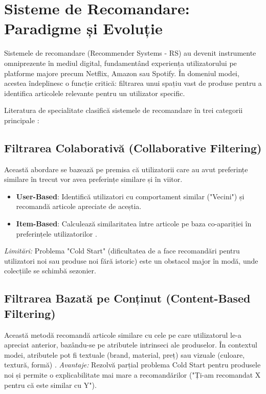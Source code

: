 \section{Sisteme de Recomandare: Paradigme și Evoluție}
\label{sec:recsys_paradigms}

Sistemele de recomandare (Recommender Systems - RS) au devenit instrumente omniprezente în mediul digital, fundamentând experiența utilizatorului pe platforme majore precum Netflix, Amazon sau Spotify. În domeniul modei, acestea îndeplinesc o funcție critică: filtrarea unui spațiu vast de produse pentru a identifica articolele relevante pentru un utilizator specific.

Literatura de specialitate clasifică sistemele de recomandare în trei categorii principale \cite{adomavicius2005toward}:

\subsection{Filtrarea Colaborativă (Collaborative Filtering)}
Această abordare se bazează pe premisa că utilizatorii care au avut preferințe similare în trecut vor avea preferințe similare și în viitor.
\begin{itemize}
    \item \textbf{User-Based}: Identifică utilizatori cu comportament similar ("Vecini") și recomandă articole apreciate de aceștia.
    \item \textbf{Item-Based}: Calculează similaritatea între articole pe baza co-apariției în preferințele utilizatorilor \cite{su2009survey}.
\end{itemize}
\textit{Limitări:} Problema "Cold Start" (dificultatea de a face recomandări pentru utilizatori noi sau produse noi fără istoric) este un obstacol major în modă, unde colecțiile se schimbă sezonier.

\subsection{Filtrarea Bazată pe Conținut (Content-Based Filtering)}
Această metodă recomandă articole similare cu cele pe care utilizatorul le-a apreciat anterior, bazându-se pe atributele intrinseci ale produselor. În contextul modei, atributele pot fi textuale (brand, material, preț) sau vizuale (culoare, textură, formă) \cite{mcauley2015image}.
\textit{Avantaje:} Rezolvă parțial problema Cold Start pentru produsele noi și permite o explicabilitate mai mare a recomandărilor ("Ți-am recomandat X pentru că este similar cu Y").

